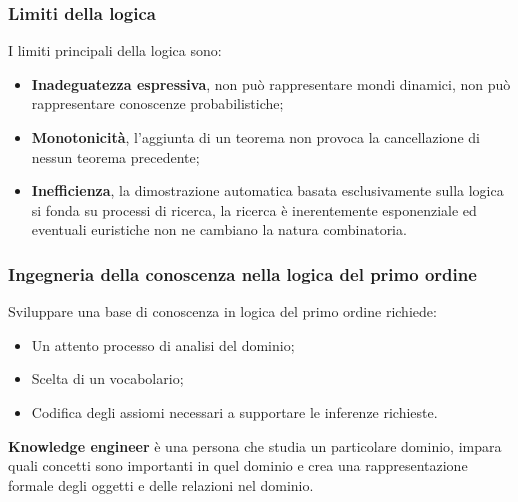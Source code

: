 \documentclass[../main.tex]{subfiles}
\begin{document}
	\subsubsection{Limiti della logica}
	I limiti principali della logica sono:
	\begin{itemize}
		\item \textbf{Inadeguatezza espressiva}, non può rappresentare mondi dinamici, non può rappresentare conoscenze probabilistiche;
		\item \textbf{Monotonicità}, l’aggiunta di un teorema non provoca la cancellazione di nessun teorema precedente;
		\item \textbf{Inefficienza}, la dimostrazione automatica basata esclusivamente sulla logica si fonda su processi di ricerca, la ricerca è inerentemente esponenziale ed eventuali euristiche non ne cambiano la natura combinatoria.
	\end{itemize}
	\subsubsection{Ingegneria della conoscenza nella logica del primo ordine}
	Sviluppare una base di conoscenza in logica del primo ordine richiede:
	\begin{itemize}
		\item Un attento processo di analisi del dominio;
		\item Scelta di un vocabolario;
		\item Codifica degli assiomi necessari a supportare le inferenze richieste.
	\end{itemize}
	\textbf{Knowledge engineer} è una persona che studia un particolare dominio, impara quali concetti sono importanti in quel dominio e crea una rappresentazione formale degli oggetti e delle relazioni nel dominio.
\end{document}
